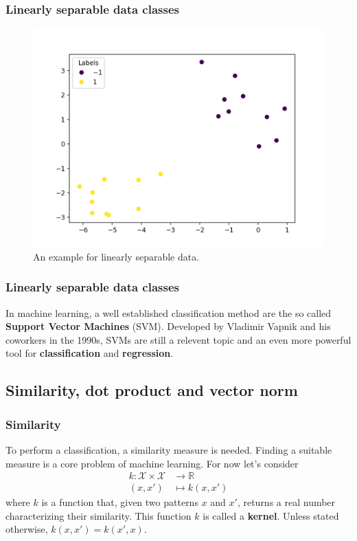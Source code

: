\documentclass{beamer}
\begin{document}
\begin{frame}{}
	\frametitle{Linearly separable data classes}
	\begin{figure}
		\centering
		\includegraphics[width=0.7\linewidth]{img/LinearSVM_Data_Labels.png}
		\caption{ An example for linearly separable data.}
		\label{fig:lineardata}
	\end{figure} 
\end{frame}


\begin{frame}{}
    \frametitle{Linearly separable data classes}
    In machine learning, a well established classification method are the so called \textbf{Support Vector Machines} (SVM). Developed by Vladimir Vapnik and his coworkers in the 1990s, SVMs are still a relevent topic and an even more powerful tool for \textbf{classification} and \textbf{regression}.
\end{frame}


\subsection{Similarity, dot product and vector norm}

\begin{frame}{}
    \frametitle{Similarity}
    To perform a classification, a similarity measure is needed. Finding a suitable measure is a core problem of machine learning. For now let's consider 
    \begin{equation}
        \begin{aligned}
            k: \mathcal{X} \times \mathcal{X} & \rightarrow \mathbb{R} \\
            (x, x') & \mapsto k(x, x')
        \end{aligned}
    \end{equation}
    where $k$ is a function that, given two patterns $x$ and $x'$, returns a real number characterizing their similarity. This function $k$ is called a \textbf{kernel}. Unless stated otherwise, $k(x, x') = k(x', x)$.
\end{frame}
\end{document}
